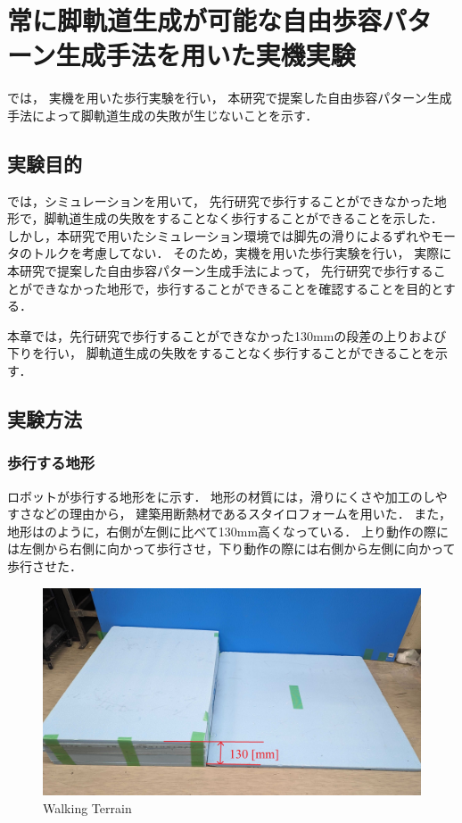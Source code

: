 
\chapter{常に脚軌道生成が可能な自由歩容パターン生成手法を用いた実機実験}\label{chapter:常に脚軌道生成が可能な自由歩容パターン生成手法を用いた実機実験}

では，
実機を用いた歩行実験を行い，
本研究で提案した自由歩容パターン生成手法によって脚軌道生成の失敗が生じないことを示す．

\section{実験目的}
では，シミュレーションを用いて，
先行研究で歩行することができなかった地形で，脚軌道生成の失敗をすることなく歩行することができることを示した．
しかし，本研究で用いたシミュレーション環境では脚先の滑りによるずれやモータのトルクを考慮してない．
そのため，実機を用いた歩行実験を行い，
実際に本研究で提案した自由歩容パターン生成手法によって，
先行研究で歩行することができなかった地形で，歩行することができることを確認することを目的とする．

本章では，先行研究で歩行することができなかった130mmの段差の上りおよび下りを行い，
脚軌道生成の失敗をすることなく歩行することができることを示す．

\section{実験方法}
\subsection{歩行する地形}
ロボットが歩行する地形をに示す．
地形の材質には，滑りにくさや加工のしやすさなどの理由から，
建築用断熱材であるスタイロフォームを用いた．
また，地形はのように，右側が左側に比べて130mm高くなっている．
上り動作の際には左側から右側に向かって歩行させ，下り動作の際には右側から左側に向かって歩行させた．

\begin{figure}[tb]
  \centering
  \includegraphics[width=0.8\linewidth]{figure/chapter5/walking-terrain.jpg}
  \caption{Walking Terrain}
  \label{fig:walking-terrain}  %
\end{figure}

